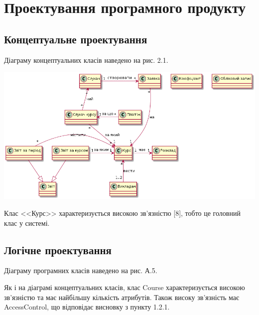\newpage
\section{Проектування програмного продукту}
\subsection{Концептуальне проектування}
\bigbreak
Діаграму концептуальних класів наведено на рис. 2.1.

\noindent\includegraphics[width=17cm]{pp_pw3_conc.png}

Клас <<Курс>> характеризується високою зв'язністю [8], тобто це головний клас у системі.
\bigbreak
\subsection{Логічне проектування}
\bigbreak
Діаграму програмних класів наведено на рис. А.5.

Як і на діаграмі концептуальних класів, клас Course характеризується високою зв'язністю та має найбільшу кількість атрибутів. Також високу зв'язність має AccessControl, що відповідає висновку з пункту 1.2.1.

\bigbreak
